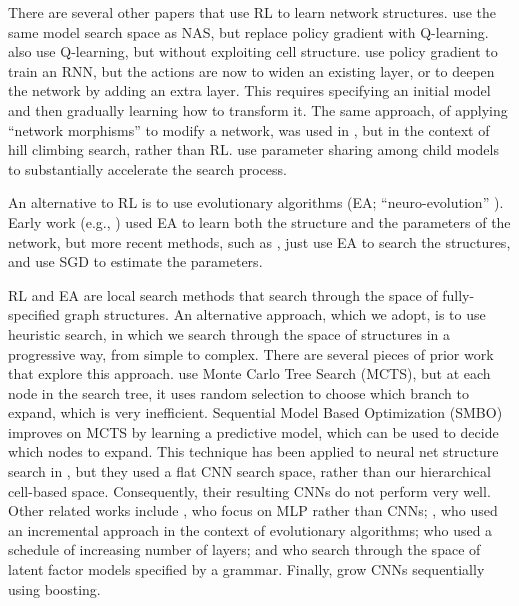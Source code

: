 \documentclass[runningheads]{llncs}
\newcommand{\NAS}{NAS}
\newcommand{\NAScell}{\NAS}
\begin{document}
There are several other papers that use RL to learn network structures.
\cite{Zhong2018}  use the same model search space as \NAScell,  but replace policy gradient with Q-learning.
\cite{DBLP:journals/corr/BakerGNR16} also use Q-learning, but without exploiting cell structure.
\cite{Cai2017} use policy gradient to train an RNN, but the actions are now to widen an existing layer, or to deepen the network by adding an extra layer. This requires specifying an initial model and then gradually learning how to transform it.
The same approach, of applying ``network morphisms'' to modify a network,
was used in 
\cite{Elsken2017}, but in the context of hill climbing search, rather than RL.
\cite{ENAS} use parameter sharing among child models to substantially accelerate the search process.


An alternative  to RL is to use evolutionary algorithms (EA; ``neuro-evolution'' \cite{Stanley2017}).
Early work
(e.g., \cite{Stanley2002})
used EA to learn both the structure and the parameters of the network,
but more recent methods,
such as \cite{DBLP:conf/icml/RealMSSSTLK17,Miikkulainen2017,DBLP:journals/corr/XieY17,Liu2017,DBLP:journals/corr/abs-1802-01548},
just use EA to search the structures, and use SGD to estimate the parameters.


RL and EA are local search methods that search through the space of fully-specified graph structures. An alternative approach, which we adopt, is to use heuristic search, in which we search through the space of structures in a progressive way, from simple to complex.
There are several pieces of prior work that explore this approach.
\cite{Negrinho2017} use Monte Carlo Tree Search (MCTS),
but at each node in the search tree, it uses random selection to choose which branch to expand,
which is very inefficient.
Sequential Model Based Optimization (SMBO) \cite{Hutter2011} improves on MCTS by learning a predictive model, which can be used to decide which nodes to expand.
This technique has been applied to neural net structure search in
\cite{Negrinho2017},
but they used a flat CNN search space, rather than our hierarchical cell-based space.
Consequently, their resulting CNNs do not perform very well.
Other related works include
\cite{Mendoza2016}, who focus on MLP rather than CNNs;
\cite{Stanley2002}, who used an incremental approach in the context of evolutionary algorithms; \cite{DBLP:journals/corr/ZophL16} who used a schedule of increasing number of layers;
and \cite{Grosse2012} who 
search through the space of latent factor models specified by a grammar.
Finally, \cite{Cortes2016,Huang2017boosting} grow CNNs sequentially using boosting.
\end{document}
